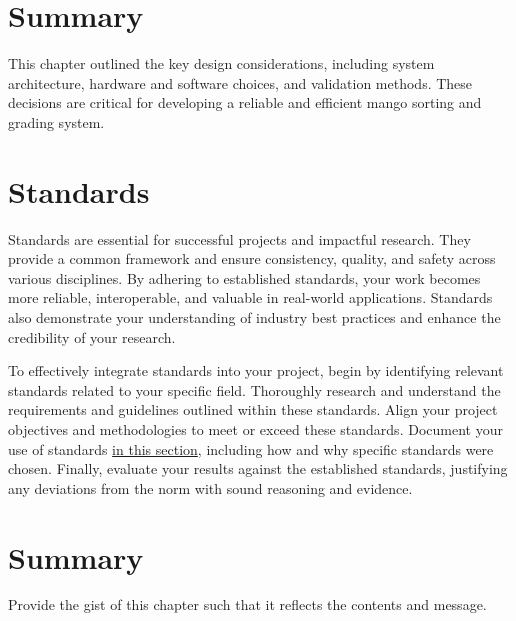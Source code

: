 \section{Summary}
This chapter outlined the key design considerations, including system architecture, hardware and software choices, and validation methods. These decisions are critical for developing a reliable and efficient mango sorting and grading system.


\section{Standards}

Standards are essential for successful projects and impactful research. They provide a common framework and ensure consistency, quality, and safety across various disciplines. By adhering to established standards, your work becomes more reliable, interoperable, and valuable in real-world applications. Standards also demonstrate your understanding of industry best practices and enhance the credibility of your research.

To effectively integrate standards into your project, begin by identifying relevant standards related to your specific field. Thoroughly research and understand the requirements and guidelines outlined within these standards. Align your project objectives and methodologies to meet or exceed these standards. Document your use of standards \underline{in this section}, including how and why specific standards were chosen. Finally, evaluate your results against the established standards, justifying any deviations from the norm with sound reasoning and evidence.

\section{Summary}

Provide the gist of this chapter such that it reflects the contents and message.